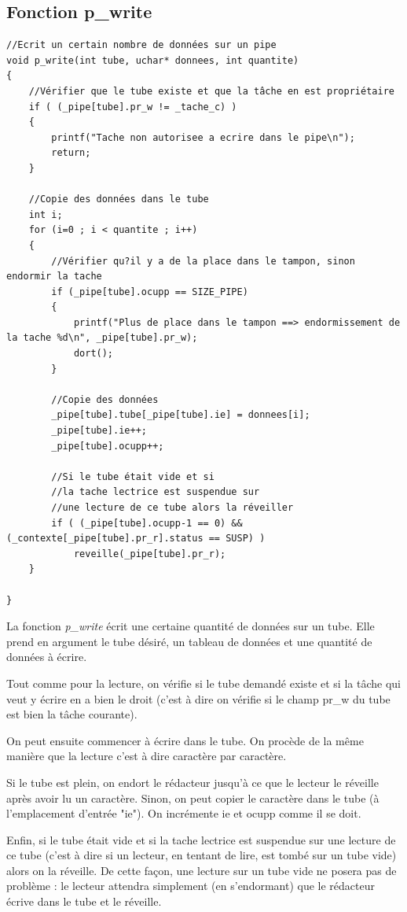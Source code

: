 \documentclass[a4paper,12pt]{report}
\begin{document}
\subsection{Fonction p\_write}
\begin{lstlisting}
//Ecrit un certain nombre de données sur un pipe
void p_write(int tube, uchar* donnees, int quantite)
{
	//Vérifier que le tube existe et que la tâche en est propriétaire
	if ( (_pipe[tube].pr_w != _tache_c) )
	{
		printf("Tache non autorisee a ecrire dans le pipe\n");
		return;
	}

	//Copie des données dans le tube
	int i;
	for (i=0 ; i < quantite ; i++)
	{
		//Vérifier qu?il y a de la place dans le tampon, sinon endormir la tache
		if (_pipe[tube].ocupp == SIZE_PIPE)
		{
			printf("Plus de place dans le tampon ==> endormissement de la tache %d\n", _pipe[tube].pr_w);
			dort();
		}

		//Copie des données
		_pipe[tube].tube[_pipe[tube].ie] = donnees[i];
		_pipe[tube].ie++;
		_pipe[tube].ocupp++;

		//Si le tube était vide et si
		//la tache lectrice est suspendue sur
		//une lecture de ce tube alors la réveiller
		if ( (_pipe[tube].ocupp-1 == 0) && (_contexte[_pipe[tube].pr_r].status == SUSP) )
			reveille(_pipe[tube].pr_r);
	}

}
\end{lstlisting}

La fonction \textit{p\_write} écrit une certaine quantité de données sur un tube.  Elle prend en argument le tube désiré, un tableau de données et une quantité de données à écrire.

Tout comme pour la lecture, on vérifie si le tube demandé existe et si la tâche qui veut y écrire en a bien le droit (c'est à dire on vérifie si le champ pr\_w du tube est bien la tâche courante).

On peut ensuite commencer à écrire dans le tube. On procède de la même manière que la lecture c'est à dire caractère par caractère.

Si le tube est plein, on endort le rédacteur jusqu'à ce que le lecteur le réveille après avoir lu un caractère. Sinon, on peut copier le caractère dans le tube (à l'emplacement d'entrée "ie"). On incrémente ie et ocupp comme il se doit.

Enfin, si le tube était vide et si la tache lectrice est suspendue sur une lecture de ce tube (c'est à dire si un lecteur, en tentant de lire, est tombé sur un tube vide) alors on la réveille. De cette façon, une lecture sur un tube vide ne posera pas de problème : le lecteur attendra simplement (en s'endormant) que le rédacteur écrive dans le tube et le réveille.
\end{document}
